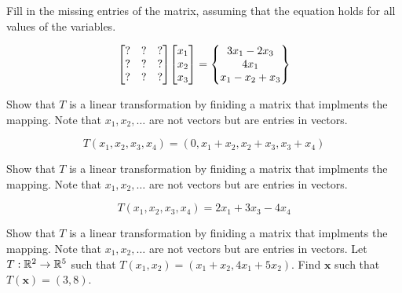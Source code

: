 \documentclass{../mathhomework}
\newcommand{\Vect}[1]{\pmb{#1}}
\newenvironment{Mat}{\begin{bmatrix}}{\end{bmatrix}}
\begin{document}
\begin{problem}[1.9\#15]
    Fill in the missing entries of the matrix, assuming that the equation holds for all values of the variables.

    \begin{equation*}
        \begin{Mat}
            ? & ? & ? \\
            ? & ? & ? \\ 
            ? & ? & ?
        \end{Mat}
        \begin{Mat}
            x_1 \\ x_2 \\ x_3
        \end{Mat} =
        \begin{Bmatrix}
            3x_1 - 2x_3 \\ 4x_1 \\ x_1 - x_2 + x_3
        \end{Bmatrix}
    \end{equation*}
\end{problem}

\begin{problem}[1.9\#17]
    Show that $T$ is a linear transformation by finiding a matrix that implments the mapping. Note that $x_1,x_2,\ldots$ are not vectors but are entries in vectors.

    \begin{equation*}
        T(x_1,x_2,x_3,x_4) = (0, x_1 + x_2, x_2 + x_3, x_3 + x_4)
    \end{equation*}
\end{problem}

\begin{problem}[1.9\#20]
    Show that $T$ is a linear transformation by finiding a matrix that implments the mapping. Note that $x_1,x_2,\ldots$ are not vectors but are entries in vectors.

    \begin{equation*}
        T(x_1,x_2,x_3,x_4) = 2x_1 + 3x_3 - 4x_4
    \end{equation*}
\end{problem}

\begin{problem}[1.9\#21]
    Show that $T$ is a linear transformation by finiding a matrix that implments the mapping. Note that $x_1,x_2,\ldots$ are not vectors but are entries in vectors.
    Let $T: \mathbb{R}^2 \to \mathbb{R}^5$ such that $T(x_1, x_2) = (x_1 + x_2, 4x_1 + 5x_2)$. Find $\Vect{x}$ such that $T(\Vect{x}) = (3,8)$.
\end{problem}
\end{document}
